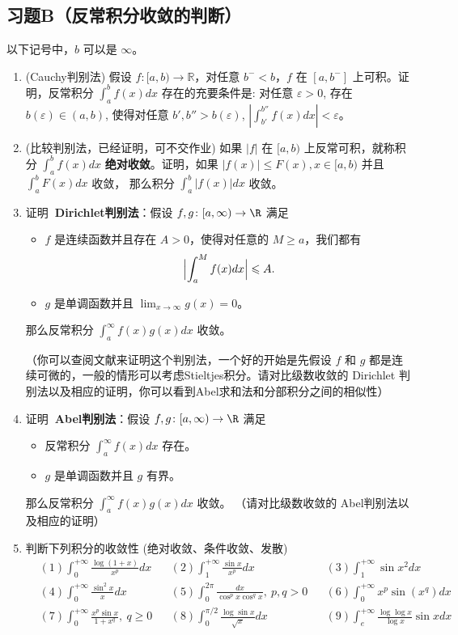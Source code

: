 \subsection{习题B（反常积分收敛的判断）}
以下记号中，$b$ 可以是 $\infty$。
\begin{enumerate}[label=B\arabic*)]
		\item (Cauchy判别法) 假设 $f\colon  [a,b) \to \mathbb{R}$，对任意 $b^- < b$，$f$ 在 $[a,b^-]$ 上可积。证明，反常积分 $\displaystyle \int_a^b f(x)dx$ 存在的充要条件是: 对任意 $\varepsilon > 0$, 存在 $b(\varepsilon)  \in (a,b)$, 使得对任意 $b', b'' > b(\varepsilon)$, $\displaystyle		\left|\int_{b'}^{b''} f(x)dx\right| < \varepsilon$。

		\item (比较判别法，已经证明，可不交作业) 如果 $|f|$ 在 $[a,b)$ 上反常可积，就称积分 $\displaystyle \int_a^b f(x)dx$ {\bf 绝对收敛}。证明，如果 $|f(x)| \leqslant F(x), x \in [a,b)$ 并且 $\displaystyle\int_a^b F(x)dx$ 收敛， 那么积分 $\displaystyle\int_a^b |f(x)|dx$ 收敛。
				\item 证明{\bf ~Dirichlet判别法}：假设 $f,g\colon [a,\infty)\rightarrow \R$ 满足
				\begin{itemize}
				\item $f$ 是连续函数并且存在 $A>0$，使得对任意的 $M \geqslant a$，我们都有
				\[\Bigl|\int_a^M f(x)dx\Bigr|\leqslant A.\]
				\item $g$ 是单调函数并且 $\displaystyle \lim_{x\rightarrow \infty}g(x)=0$。
				\end{itemize}
				那么反常积分 $\displaystyle\int_a^\infty f(x)g(x)dx$ 收敛。

			（你可以查阅文献来证明这个判别法，一个好的开始是先假设 $f$ 和 $g$ 都是连续可微的，一般的情形可以考虑Stieltjes积分。请对比级数收敛的 Dirichlet 判别法以及相应的证明，你可以看到Abel求和法和分部积分之间的相似性）

\item 证明{\bf ~Abel判别法}：假设 $f,g\colon [a,\infty)\rightarrow \R$ 满足
				\begin{itemize}
				\item 反常积分 $\displaystyle \int_a^\infty f(x)dx$ 存在。
				\item $g$ 是单调函数并且 $g$ 有界。
				\end{itemize}
				那么反常积分 $\displaystyle\int_a^\infty f(x)g(x)dx$ 收敛。
（请对比级数收敛的 Abel判别法以及相应的证明）

	       \item 判断下列积分的收敛性 (绝对收敛、条件收敛、发散)
	\begin{align*}
	& (1) \int_{0}^{+\infty} \frac{\log (1+x)}{x^p} dx
	&& (2)\int_{1}^{+\infty} \frac{\sin x}{x^p} dx && (3) \int_{1}^{+\infty} \sin x^2 dx\\
	& (4) \int_{0}^{+\infty} \frac{\sin^2 x}{x}dx  && (5) \int_{0}^{2\pi} \frac{dx}{\cos^p x \cos^q x}, ~ p,q >0 && (6) \int_{0}^{+\infty} x^p \sin (x^q) dx \\
	& (7) \int_{0}^{+\infty} \frac{x^p \sin x}{1 + x^q}, ~ q \geq 0 && (8) \int_{0}^{\pi/2} \frac{\log \sin x}{\sqrt{x}} dx && (9) \int_{e}^{+\infty} \frac{\log \log x}{\log x} \sin x dx
	\end{align*}
	\end{enumerate}

